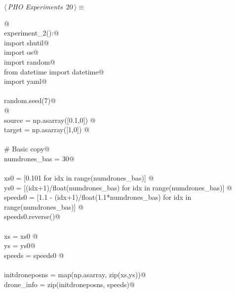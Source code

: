 \documentclass[10.0pt]{report}
\begin{document}
\begin{flushleft} \small
\begin{minipage}{\linewidth}\label{scrap10}\raggedright\small
{} $\langle\,${\itshape PHO Experiments}\nobreak\ {\footnotesize {20}}$\,\rangle\equiv$
\vspace{-1ex}
\begin{list}{}{} \item
\mbox{}\verb@  @\\
\mbox{}\verb@def experiment_2():@\\
\mbox{}\verb@    import shutil@\\
\mbox{}\verb@    import os@\\
\mbox{}\verb@    import random@\\
\mbox{}\verb@    from datetime import datetime@\\
\mbox{}\verb@    import yaml@\\
\mbox{}\verb@@\\
\mbox{}\verb@    random.seed(7)@\\
\mbox{}\verb@   @\\
\mbox{}\verb@    source  = np.asarray([0.1,0]) @\\
\mbox{}\verb@    target  = np.asarray([1,0]) @\\
\mbox{}\verb@@\\
\mbox{}\verb@    # Basic copy@\\
\mbox{}\verb@    numdrones_bas = 30@\\
\mbox{}\verb@@\\
\mbox{}\verb@    xs0     = [0.101                                for idx in range(numdrones_bas)] @\\
\mbox{}\verb@    ys0     = [(idx+1)/float(numdrones_bas)         for idx in range(numdrones_bas)] @\\
\mbox{}\verb@    speeds0 = [1.1 - (idx+1)/float(1.1*numdrones_bas) for idx in range(numdrones_bas)] @\\
\mbox{}\verb@    speeds0.reverse()@\\
\mbox{}\verb@@\\
\mbox{}\verb@    xs = xs0 @\\
\mbox{}\verb@    ys = ys0@\\
\mbox{}\verb@    speeds = speeds0 @\\
\mbox{}\verb@@\\
\mbox{}\verb@    initdroneposns = map(np.asarray, zip(xs,ys))@\\
\mbox{}\verb@    drone_info = zip(initdroneposns, speeds)@\\

\end{list}
\end{minipage}
\end{flushleft}
\end{document}
